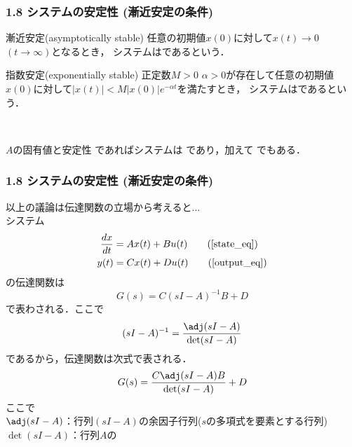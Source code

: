 \begin{frame}[t]
\frametitle{1.8 システムの安定性 (漸近安定の条件)}
\begin{block}{漸近安定(asymptotically stable)}
任意の初期値$x(0)$に対して$x(t) \rightarrow 0$ $(t \rightarrow \infty)$となるとき，
システムはであるという．
\end{block}
\begin{block}{指数安定(exponentially stable)}
正定数$M>0$ $\alpha>0$が存在して任意の初期値$x(0)$に対して$|x(t)| < M |x(0)| e^{-\alpha t}$を満たすとき，
システムはであるという．
\end{block}
\ \\

\begin{block}{$A$の固有値と安定性}
であればシステムは であり，加えて でもある．
\end{block}

\end{frame}


\begin{frame}[t]
\frametitle{1.8 システムの安定性 (漸近安定の条件)}
以上の議論は伝達関数の立場から考えると...\\
システム
\begin{align}
   \frac{dx}{dt} &= A x(t) + B u(t) \tag{\ref{state_eq}} \\
   y(t) &= C x(t) + D u(t) \tag{\ref{output_eq}}
\end{align}
の伝達関数は
\begin{equation}
 G(s) = C ( sI - A )^{-1} B + D
\end{equation}
で表わされる．ここで
\begin{equation}
 (s I - A)^{-1}
  = \frac{\adj (s I - A)}{\det (s I - A )}
\end{equation}
であるから，伝達関数は次式で表される．
\begin{equation}
 G(s)
  = \frac{C \adj (s I - A)B}{\det (s I - A )}
  + D
\end{equation}
ここで\\
$\adj (s I - A)$：行列$(s I - A)$の余因子行列($s$の多項式を要素とする行列)\\
$\det (s I - A)$：行列$A$の
\end{frame}


